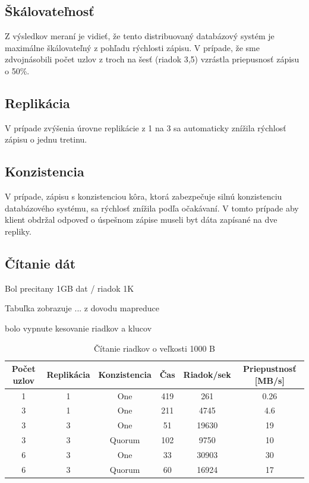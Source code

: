\documentclass[11pt,twoside,a4paper]{book}
\begin{document}
\subsection*{Škálovateľnosť}

Z výsledkov meraní je vidieť, že tento distribuovaný databázový systém je maximálne škálovateľný z pohľadu rýchlosti zápisu. V prípade, že sme zdvojnásobili počet uzlov z troch na šesť (riadok 3,5) vzrástla priepusnosť zápisu o 50\%.

\subsection*{Replikácia}

V prípade zvýšenia úrovne replikácie z 1 na 3 sa automaticky znížila rýchlosť zápisu o jednu tretinu.

\subsection*{Konzistencia}

V prípade, zápisu s konzistenciou kôra, ktorá zabezpečuje silnú konzistenciu databázového systému, sa rýchlosť znížila podľa očakávaní. V tomto prípade aby klient obdržal odpoveď o úspešnom zápise museli byt dáta zapísané na dve repliky.  

\subsection*{Čítanie dát}

Bol precitany 1GB dat / riadok 1K

Tabuľka zobrazuje ... z dovodu mapreduce

bolo vypnute kesovanie riadkov a klucov

\begin{table}[hp]
\begin{center}
\begin{tabular}{|c|c|c|c|c|c|}

\hline Počet uzlov & Replikácia & Konzistencia & Čas & Riadok/sek & Priepustnosť [MB/s]\\ 
\hline
\hline 1 & 1 & One & 419 & 261 & 0.26\\ 
\hline 3 & 1 & One & 211 & 4745 & 4.6\\ 
\hline 3 & 3 & One & 51 & 19630 & 19\\ 
\hline 3 & 3 & Quorum & 102 & 9750 & 10\\ 
\hline 6 & 3 & One & 33 & 30903 & 30\\ 
\hline 6 & 3 & Quorum & 60 & 16924 & 17\\ 
\hline
\end{tabular} 
\end{center}
\caption{Čítanie riadkov o veľkosti 1000 B}
\label{tab:CPerf3}
\end{table}
\end{document}
